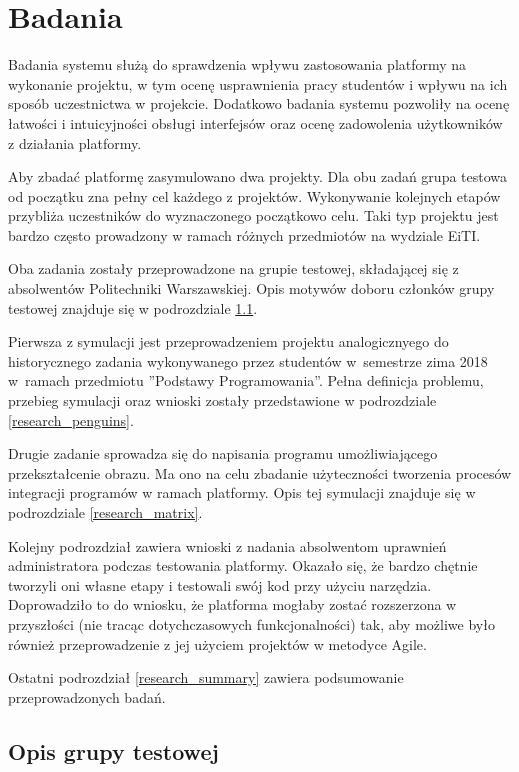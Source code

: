 \chapter{Badania}
\label{chapter:research}

Badania systemu służą do sprawdzenia wpływu zastosowania platformy na wykonanie projektu, w tym ocenę usprawnienia pracy studentów i wpływu na ich sposób uczestnictwa w projekcie.
Dodatkowo badania systemu pozwoliły na ocenę łatwości i intuicyjności obsługi interfejsów oraz ocenę zadowolenia użytkowników z działania platformy.

Aby zbadać platformę zasymulowano dwa projekty.
Dla obu zadań grupa testowa od początku zna pełny cel każdego z projektów.
Wykonywanie kolejnych etapów przybliża uczestników do wyznaczonego początkowo celu.
Taki typ projektu jest bardzo często prowadzony w ramach różnych przedmiotów na wydziale EiTI.

Oba zadania zostały przeprowadzone na grupie testowej, składającej się z absolwentów Politechniki Warszawskiej.
Opis motywów doboru członków grupy testowej znajduje się w podrozdziale \ref{research_group}.

Pierwsza z symulacji jest przeprowadzeniem projektu analogicznyego do historycznego zadania wykonywanego przez studentów w~semestrze zima 2018 w~ramach przedmiotu ”Podstawy Programowania”.
Pełna definicja problemu, przebieg symulacji oraz wnioski zostały przedstawione w podrozdziale \ref{research_penguins}.

Drugie zadanie sprowadza się do napisania programu umożliwiającego przekształcenie obrazu.
Ma ono na celu zbadanie użyteczności tworzenia procesów integracji programów w ramach platformy.
Opis tej symulacji znajduje się w podrozdziale \ref{research_matrix}.

Kolejny podrozdział zawiera wnioski z nadania absolwentom uprawnień administratora podczas testowania platformy.
Okazało się, że bardzo chętnie tworzyli oni własne etapy i testowali swój kod przy użyciu narzędzia.
Doprowadziło to do wniosku, że platforma mogłaby zostać rozszerzona w przyszłości (nie tracąc dotychczasowych funkcjonalności) tak, aby możliwe było również przeprowadzenie z jej użyciem projektów w metodyce Agile.

Ostatni podrozdział \ref{research_summary} zawiera podsumowanie przeprowadzonych badań.


\section{Opis grupy testowej}
\label{research_group}


